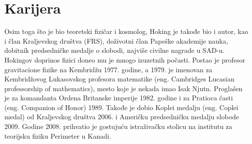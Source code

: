 \documentclass[a4paper, 12pt]{article}
\begin{document}
{\section{Karijera}
Osim toga što je bio teoretski fizičar i kosmolog, Hoking je takođe bio i autor, kao i član Kraljevskog društva (FRS), doživotni član Papeške akademije nauka, dobitnik predsedničke medalje o slobodi, najviše civilne nagrade u SAD-u. Hokingov doprinos fizici doneo mu je mnogo izuzetnih počasti. Postao je profesor gravitacione fizike na Kembridžu 1977. godine, a 1979. je imenovan za Kembridžovog Lukasovskog profesora matematike (eng. Cambridges Lucasian professorship of mathematics), mesto koje je nekada imao Isak Njutn. Proglašen je za komandanta Ordena Britanske imperije 1982. godine i za Pratioca časti (eng. Companion of Honor) 1989. Takođe je dobio Koplei medalju (eng. Coplei medal) od Kraljevskog društva 2006. i Američku predsedničku medalju slobode 2009. Godine 2008. prihvatio je gostujuću istraživačku stolicu na institutu za teorijsku fiziku Perimeter u Kanadi.

}
\end{document}
